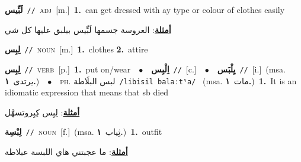 \documentclass[10pt,a4paper,twoside]{article} %
\begin{document}
\begin{multicols}{2}
{\setlength\topsep{0pt}\textbf{\foreignlanguage{arabic}{لَبِّيس}}\ {\color{gray}\texttt{//}\color{black}}\ \textsc{adj}\ [m.]\ \textbf{1.}~can get dressed with ay type or colour of clothes easily\  \begin{flushright}\color{gray}\foreignlanguage{arabic}{\textbf{\underline{\foreignlanguage{arabic}{أمثلة}}}: العروسة جسمها لَبِّيس بيلبق عليها كل شي}\end{flushright}\color{black}} \vspace{2mm}

{\setlength\topsep{0pt}\textbf{\foreignlanguage{arabic}{لِبِس}}\ {\color{gray}\texttt{//}\color{black}}\ \textsc{noun}\ [m.]\ \textbf{1.}~clothes  \textbf{2.}~attire\ } \vspace{2mm}

{\setlength\topsep{0pt}\textbf{\foreignlanguage{arabic}{لِبِس}}\ {\color{gray}\texttt{//}\color{black}}\ \textsc{verb}\ [p.]\ \textbf{1.}~put on/wear\ \ $\bullet$\ \ \setlength\topsep{0pt}\textbf{\foreignlanguage{arabic}{اِلْبِس}}\ {\color{gray}\texttt{//}\color{black}}\ [c.]\ \ $\bullet$\ \ \setlength\topsep{0pt}\textbf{\foreignlanguage{arabic}{يِلْبَس}}\ {\color{gray}\texttt{//}\color{black}}\ [i.]\ \color{gray}(msa. \foreignlanguage{arabic}{يرتدى}~\foreignlanguage{arabic}{\textbf{١.}})\color{black}\ \ $\bullet$\ \ \textsc{ph.} \color{gray} \foreignlanguage{arabic}{لبس البلَاطة}\color{black}\ {\color{gray}\texttt{/{\sffamily libisil balaːtˤa}/}\color{black}}\ \color{gray} (msa. \foreignlanguage{arabic}{مات}~\foreignlanguage{arabic}{\textbf{١.}})\color{black}\ \textbf{1.}~It is an idiomatic expression that means that sb died\  \begin{flushright}\color{gray}\foreignlanguage{arabic}{\textbf{\underline{\foreignlanguage{arabic}{أمثلة}}}: لِبِس كِبِروتسهَّل}\end{flushright}\color{black}} \vspace{2mm}

{\setlength\topsep{0pt}\textbf{\foreignlanguage{arabic}{لِبْسِة}}\ {\color{gray}\texttt{//}\color{black}}\ \textsc{noun}\ [f.]\ \color{gray}(msa. \foreignlanguage{arabic}{ثِياب}~\foreignlanguage{arabic}{\textbf{١.}})\color{black}\ \textbf{1.}~outfit\  \begin{flushright}\color{gray}\foreignlanguage{arabic}{\textbf{\underline{\foreignlanguage{arabic}{أمثلة}}}: ما عجبتني هاي اللبسة عبلاطة}\end{flushright}\color{black}} \vspace{2mm}


\end{multicols}
\end{document}
